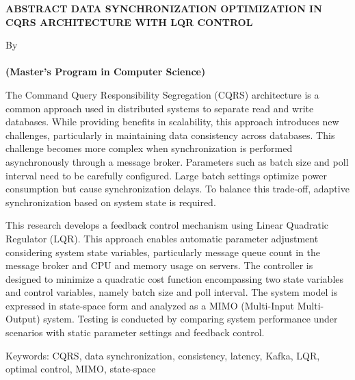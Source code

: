 \clearpage
\pagestyle{empty}


\begin{center}
    \fontsize{14}{17}\selectfont \bfseries \MakeUppercase{ABSTRACT}
    \singlespacing
    \fontsize{14}{17}\selectfont \bfseries \MakeUppercase{DATA SYNCHRONIZATION OPTIMIZATION IN CQRS ARCHITECTURE WITH LQR CONTROL}

    \vspace{\baselineskip}

   \normalsize \normalfont
    By\\
    \textbf{\fontsize{14pt}{17pt}\selectfont \theauthor \\[0.5ex]
    (Master's Program in Computer Science)}

    \vspace{3\baselineskip}
\end{center}

\begin{singlespace}
\begin{itshape}

The Command Query Responsibility Segregation (CQRS) architecture is a common approach used in distributed systems to separate read and write databases. While providing benefits in scalability, this approach introduces new challenges, particularly in maintaining data consistency across databases. This challenge becomes more complex when synchronization is performed asynchronously through a message broker. Parameters such as batch size and poll interval need to be carefully configured. Large batch settings optimize power consumption but cause synchronization delays. To balance this trade-off, adaptive synchronization based on system state is required.

This research develops a feedback control mechanism using Linear Quadratic Regulator (LQR). This approach enables automatic parameter adjustment considering system state variables, particularly message queue count in the message broker and CPU and memory usage on servers. The controller is designed to minimize a quadratic cost function encompassing two state variables and control variables, namely batch size and poll interval. The system model is expressed in state-space form and analyzed as a MIMO (Multi-Input Multi-Output) system. Testing is conducted by comparing system performance under scenarios with static parameter settings and feedback control.

Keywords: CQRS, data synchronization, consistency, latency, Kafka, LQR, optimal control, MIMO, state-space

\end{itshape}
\end{singlespace}

\clearpage